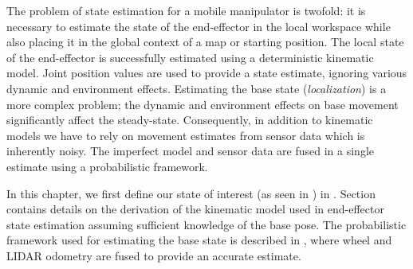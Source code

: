 \documentclass[times, utf8, diplomski, english]{fer}
\begin{document}
The problem of state estimation for a mobile manipulator is twofold: it is necessary to estimate the state of the end-effector in the local workspace while also placing it in the global context of a map or starting position.
The local state of the end-effector is successfully estimated using a deterministic kinematic model.
Joint position values are used to provide a state estimate, ignoring various dynamic and environment effects.
Estimating the base state (\textit{localization}) is a more complex problem; the dynamic and environment effects on base movement significantly affect the steady-state.
Consequently, in addition to kinematic models we have to rely on movement estimates from sensor data which is inherently noisy.
The imperfect model and sensor data are fused in a single estimate using a probabilistic framework.

In this chapter, we first define our state of interest (as seen in ) in . 
Section  contains details on the derivation of the kinematic model used in end-effector state estimation assuming sufficient knowledge of the base pose. 
The probabilistic framework used for estimating the base state is described in , where wheel and LIDAR odometry are fused to provide an accurate estimate.
\end{document}
